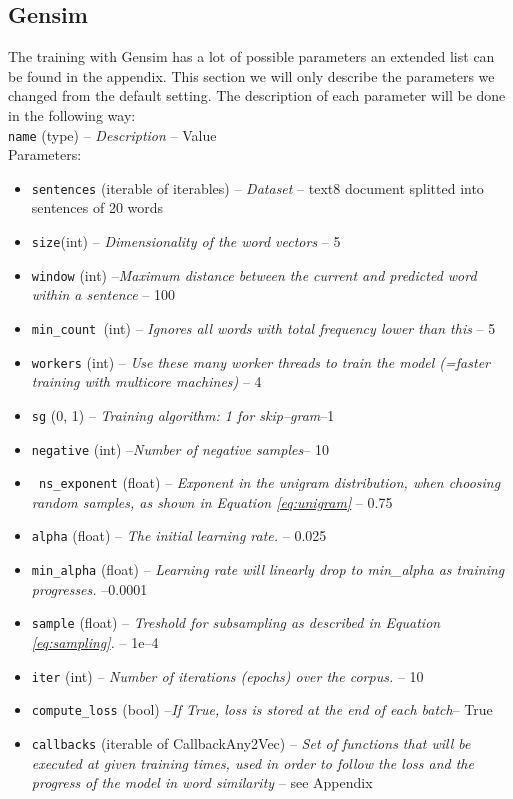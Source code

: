 \subsection{Gensim}
The training with Gensim has a lot of possible parameters an extended list can be found in the appendix. This section we will only describe the parameters we changed from the default setting.  The description of each parameter will be done in the following way: \\
\texttt{name} (type) -- \textit{Description} -- Value\\
Parameters:
\begin{itemize}
   \item \texttt{sentences} (iterable of iterables) -- \textit{Dataset} -- text8 document splitted into sentences of 20 words 
  \item \texttt{size}(int) – \textit{Dimensionality of the word vectors } -- 5
\item \texttt{window} (int) --\textit {Maximum distance between the current and predicted word within a sentence }-- 100
  \item  \texttt{min\_count }(int) --\textit{ Ignores all words with total frequency lower than this }-- 5
 \item   \texttt{workers} (int) -- \textit{ Use these many worker threads to train the model (=faster training with multicore machines) }-- 4 
\item    \texttt{sg} ({0, 1}) --\textit{ Training algorithm: 1 for skip--gram}--1
  \item  \texttt{negative} (int) --\textit{Number of negative samples}-- 10 
\item   \texttt{ ns\_exponent} (float) --\textit{ Exponent in the unigram distribution, when choosing random samples, as shown in Equation \ref{eq:unigram} }-- 0.75
\item    \texttt{alpha} (float) --\textit{ The initial learning rate. }-- 0.025
 \item   \texttt{min\_alpha} (float) --\textit{ Learning rate will linearly drop to min\_alpha as training progresses. }--0.0001
 \item   \texttt{sample} (float) --\textit{ Treshold for subsampling as described in Equation \ref{eq:sampling}. } -- 1e--4
  \item  \texttt{iter} (int) --\textit{ Number of iterations (epochs) over the corpus. }-- 10 
 \
  \item  \texttt{compute\_loss} (bool) --\textit{If True, loss is stored at the end of each batch}-- True
 \item   \texttt{callbacks} (iterable of CallbackAny2Vec) --\textit{ Set of functions that will be executed at given training times, used in order to follow the loss and the progress of the model in word similarity }-- see Appendix
\end{itemize}

